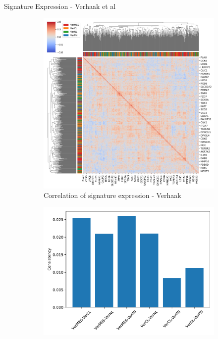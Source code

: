 \documentclass[aspectratio=169,9pt]{beamer}
\begin{document}
    \begin{frame}{Signature Expression - Verhaak et al}
        \begin{adjustwidth}{-5cm}{-5cm}
            \centering
            \begin{figure}
                \centering
                \begin{subfigure}[c]{0.48\textwidth}
                    \centering
                    \includegraphics[width=\textwidth]{CCLE_Corrplot_Ver}
                    \caption{Correlation of signature expression - Verhaak}
                \end{subfigure}
                \begin{subfigure}[c]{0.4\textwidth}
                    \centering
                    \includegraphics[width=\textwidth]{CCLE_Consistency_Ver}

\end{subfigure}
\end{figure}
\end{adjustwidth}
\end{frame}
\end{document}
